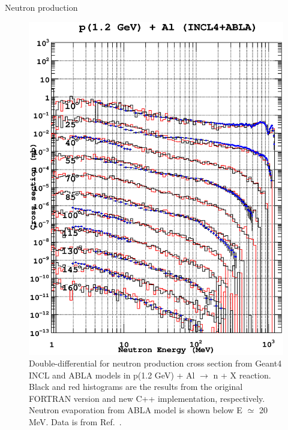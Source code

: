 \documentclass[a4paper]{jpconf}
\begin{document}
Neutron production

\begin{figure}
\begin{center}
\includegraphics[scale=0.70]{poster/images/aluminum.eps}
\caption{Double-differential for neutron production cross section
    from Geant4 INCL and ABLA models in p(1.2 GeV) + Al $\rightarrow$ n + X reaction.
Black and red histograms are the
    results from the original FORTRAN version and new C++ implementation, respectively. 
Neutron evaporation from ABLA model is shown below E $\simeq$ 20 MeV.
Data is from Ref.~\cite{data}.}
\label{fig:neutronAl}
\end{center}
\end{figure}
\end{document}

